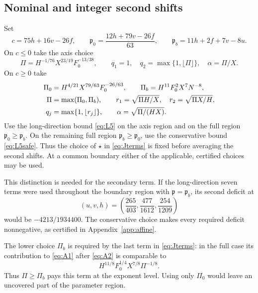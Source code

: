 \documentclass[11pt,a4paper]{article}
\numberwithin{equation}{section}
\theoremstyle{remark}
\newcommand{\Fzero}{F_0}
\begin{document}
\subsection{Nominal and integer second shifts}
Set
\begin{equation}\label{eq:c-p0-pb}
 c=75h+16v-26f,\qquad
 \mathfrak p_0=\frac{12h+79v-26f}{63},\qquad
 \mathfrak p_b=11h+2f+7v-8u.
\end{equation}
On $c\le0$ take the axis choice
\begin{equation}\label{eq:axis-choice}
 \Pi=H^{-1/76}X^{23/19}\Fzero^{-13/38},\qquad
 q_1=1,\quad q_2=\max\{1,\lfloor\Pi\rfloor\},\quad\alpha=\Pi/X.
\end{equation}
On $c\ge0$ take
\begin{align}
 \Pi_0&=H^{4/21}X^{79/63}\Fzero^{-26/63},\qquad
 \Pi_b=H^{11}\Fzero^2X^7N^{-8},\notag\\
 \Pi&=\max(\Pi_0,\Pi_b),\qquad
 r_1=\sqrt{\Pi H/X},\quad r_2=\sqrt{\Pi X/H},\label{eq:full-choice}\\
 q_j&=\max\{1,\lfloor r_j\rfloor\},\qquad
 \alpha=\sqrt{\Pi/(HX)}.\notag
\end{align}
Use the long-direction bound \eqref{eq:L5} on the axis region and on
the full region $\mathfrak p_0\ge\mathfrak p_b$. On the remaining full
region $\mathfrak p_b\ge\mathfrak p_0$, use the conservative bound
\eqref{eq:L5safe}. Thus the choice of $\star$ in \eqref{eq:Jterms}
is fixed before averaging the second shifts. At a common boundary either
of the applicable, certified choices may be used.

This distinction is needed for the secondary term. If the long-direction
seven terms were used throughout the boundary region with
$\mathfrak p=\mathfrak p_b$, its second deficit at
\[
 (u,v,h)=\left(\frac{265}{403},\frac{477}{1612},\frac{254}{1209}\right)
\]
would be $-4213/1934400$. The conservative choice makes every required
deficit nonnegative, as certified in Appendix~\ref{app:affine}.

The lower choice $\Pi_b$ is required by the last term in
\eqref{eq:Jterms}: in the full case its contribution to \eqref{eq:A1}
after \eqref{eq:A2} is comparable to
\begin{equation}\label{eq:Pi-boundary-term}
 H^{11/8}\Fzero^{1/4}X^{7/8}\Pi^{-1/8}.
\end{equation}
Thus $\Pi\ge\Pi_b$ pays this term at the exponent level. Using only
$\Pi_0$ would leave an uncovered part of the parameter region.
\end{document}
